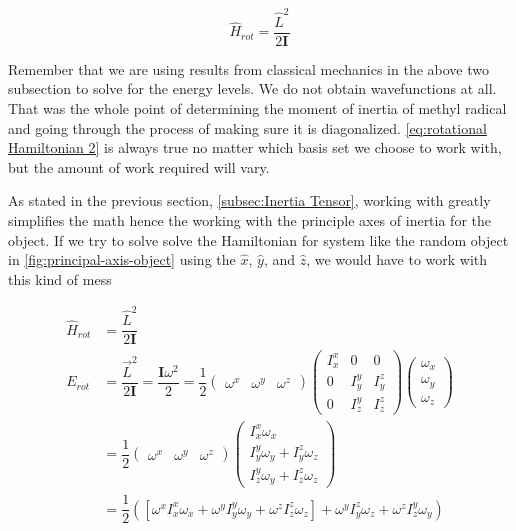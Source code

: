 \documentclass[11pt,a4paper]{book}
\begin{document}
			\begin{equation}
				\label{eq:rotational Hamiltonian 2}
				\hat{H}_{rot} = \dfrac{\hat{L}^2}{2\textbf{I}} 
			\end{equation}
		
			\noindent	
			Remember that we are using results from classical mechanics in the above two subsection to solve for the energy levels. We do not obtain wavefunctions at all. That was the whole point of determining the moment of inertia of methyl radical and going through the process of making sure it is diagonalized. \autoref{eq:rotational Hamiltonian 2} is always true no matter which basis set we choose to work with, but the amount of work required will vary. 
			
			As stated in the previous section, \autoref{subsec:Inertia Tensor}, working with greatly simplifies the math hence the working with the principle axes of inertia for the object. If we try to solve solve the Hamiltonian for system like the random object in \autoref{fig:principal-axis-object} using the $\hat{x}$, $\hat{y}$, and $\hat{z}$, we would have to work  with this kind of mess
			
			\begin{equation*}
				\label{eq:rotational energy carteisan}
				\begin{split}
				\hat{H}_{rot} &= \dfrac{\hat{L}^2}{2\textbf{I}} \\
				E_{rot} &=\dfrac{\vec{L}^2}{2\textbf{I}} 
				=\dfrac{\textbf{I}\omega^2}{2}
				=\dfrac{1}{2}
				\begin{pmatrix}
					\omega^x &	\omega^y & \omega^z
				\end{pmatrix}
				\begin{pmatrix}
					I_x^x & 0 & 0  \\
					0 & I_y^y & I_y^z\\
					0 & I_z^y & I_z^z
				\end{pmatrix} 						
				\begin{pmatrix}
				 \omega_x\\
				 \omega_y\\
				 \omega_z
				\end{pmatrix}\\
				& = \dfrac{1}{2} 
				\begin{pmatrix}
					\omega^x &	\omega^y & \omega^z
				\end{pmatrix}
				\begin{pmatrix}
					I_x^x\omega_x  \\
					I_y^y\omega_y + I_y^z\omega_z\\
					I_z^y\omega_y + I_z^z\omega_z
				\end{pmatrix} 			\\	
				& = \dfrac{1}{2}
				\left( 
					\left[
					\omega^xI_x^x\omega_x + \omega^yI_y^y\omega_y + 	\omega^zI_z^z\omega_z
					\right] 
					+ \omega^yI_y^z \omega_z + \omega^zI_z^y\omega_y
				\right)
				\end{split}
			\end{equation*}
			
\end{document}
